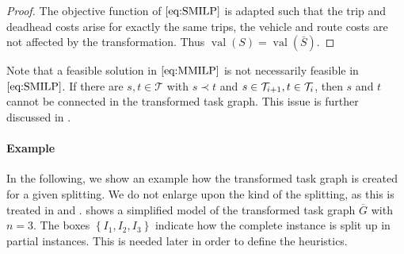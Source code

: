 \begin{proof}
The objective function of $\eqref{eq:SMILP}$ is adapted such that the trip and deadhead costs arise for exactly the same trips, the vehicle and route costs are not affected by the transformation. Thus ${\operatorname{val}(S)=\operatorname{val}(\bar{S})}$.

\end{proof}

\begin{remark}

Note that a feasible solution in $\eqref{eq:MMILP}$ is not necessarily feasible in $\eqref{eq:SMILP}$. If there are ${s,t\in\mathcal{T}}$ with ${s\prec t}$ and ${s\in\mathcal{T}_{i+1}}, {t\in\mathcal{T}_i}$, then $s$ and $t$ cannot be connected in the transformed task graph. This issue is further discussed in .

\end{remark}

\paragraph{Example} \parfill

In the following, we show an example how the transformed task graph is created for a given splitting. We do not enlarge upon the kind of the splitting, as this is treated in  and .  shows a simplified model of the transformed task graph $\overline{G}$ with $n=3$. The boxes $\left\{I_1,I_2,I_3\right\}$ indicate how the complete instance is split up in partial instances. This is needed later in order to define the heuristics.

